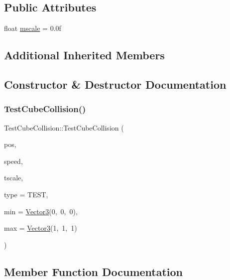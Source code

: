 \subsection*{Public Attributes}
\begin{DoxyCompactItemize}
\item 
float \hyperlink{class_test_cube_collision_a3cd9b6464419d2c5a26bfc42d120819c}{mscale} = 0.\+0f
\end{DoxyCompactItemize}
\subsection*{Additional Inherited Members}


\subsection{Constructor \& Destructor Documentation}
\mbox{\label{class_test_cube_collision_a512c666b3899713b54b096e3e5ab5e58}} 
\subsubsection{\texorpdfstring{Test\+Cube\+Collision()}{TestCubeCollision()}}
{\footnotesize\ttfamily Test\+Cube\+Collision\+::\+Test\+Cube\+Collision (\begin{DoxyParamCaption}\item[{\hyperlink{class_vector3}{Vector3}}]{pos,  }\item[{\hyperlink{class_vector3}{Vector3}}]{speed,  }\item[{float}]{tscale,  }\item[{\hyperlink{_game_object_8h_a57678b60d65afb213d04a6b090c64a08}{Game\+Object\+Type}}]{type = {\ttfamily TEST},  }\item[{\hyperlink{class_vector3}{Vector3}}]{min = {\ttfamily \hyperlink{class_vector3}{Vector3}(0,~0,~0)},  }\item[{\hyperlink{class_vector3}{Vector3}}]{max = {\ttfamily \hyperlink{class_vector3}{Vector3}(1,~1,~1)} }\end{DoxyParamCaption})\hspace{0.3cm}{\ttfamily [inline]}}



\subsection{Member Function Documentation}
\mbox{\label{class_test_cube_collision_a22fade1ca48a2cd49dd4ca6cbc93821b}} 
